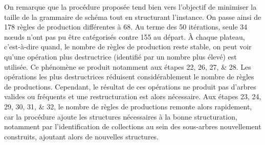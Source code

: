 On remarque que la procédure proposée tend bien vers l'objectif de minimiser la taille de la grammaire de schéma tout en structurant l'instance.
On passe ainsi de \num{178} règles de production différentes à \num{68}.
Au terme des \num{50} itérations, seule \num{34} nœuds n'ont pas pu être catégorisés contre \num{155} au départ.
À chaque plateau, c'est-à-dire quand, le nombre de règles de production reste stable, on peut voir qu'une opération plus destructrice (identifié par un nombre plus élevé) est utilisée.
Ce phénomène se produit notamment aux étapes \numlist{22;26;27;28}.
Les opérations les plus destructrices réduisent considérablement le nombre de règles de productions.
Cependant, le résultat de ces opérations ne produit pas d'arbres valides ou fréquents et une restructuration est alors nécessaire.
Aux étapes \numlist{23;24;29;30;31;32}, le nombre de règles de productions remonte alors rapidement, car la procédure ajoute les structures nécessaires à la bonne structuration, notamment par l'identification de collections au sein des sous-arbres nouvellement construits, ajoutant alors de nouvelles structures.

